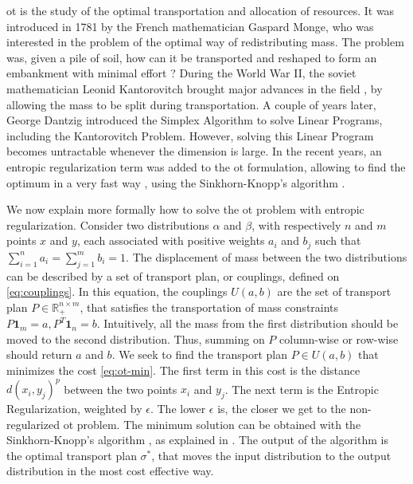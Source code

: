 \acf{ot} is the study of the optimal transportation and allocation of resources.
It was introduced in 1781 by the French mathematician Gaspard Monge,
\cite{monge_memoire_1781} who was interested in the problem of the optimal way
of redistributing mass. The problem was, given a pile of soil, how can it be
transported and reshaped to form an embankment with minimal effort ? During
the World War II, the soviet mathematician Leonid Kantorovitch brought major
advances in the field \cite{kantorovitch_translocation_1958}, by allowing the
mass to be split during transportation. A couple of years later, George
Dantzig introduced the Simplex Algorithm to solve Linear Programs, including
the Kantorovitch Problem. However, solving this Linear Program becomes
untractable whenever the dimension is large. In the recent years, an
entropic regularization term was added to the \ac{ot} formulation, allowing to
find the optimum in a very fast way \cite{cuturi_sinkhorn_2013}, using the
Sinkhorn-Knopp's algorithm \cite{knopp_concerning_1967}.

We now explain more formally how to solve the \ac{ot} problem with entropic
regularization. Consider two distributions $\alpha$ and $\beta$, with
respectively $n$ and $m$ points $x$ and $y$, each associated with positive weights
$a_i$ and $b_j$ such that $\sum_{i=1}^{n} a_i = \sum_{j=1}^{m} b_i = 1$. The
displacement of mass between the two distributions can be described by a
set of transport plan, or couplings, defined on \cref{eq:couplings}. In
this equation, the couplings $U(a, b)$ are the set of transport plan
$P \in \mathbb{R}_{+}^{n \times m}$, that satisfies the transportation of mass
constraints $P \mathbf{1}_m = a, P^T \mathbf{1}_n = b$. Intuitively, all
the mass from the first distribution should be moved to the second
distribution. Thus, summing on $P$ column-wise or row-wise should return $a$
and $b$. We seek to find the transport plan $P \in U(a, b)$ that minimizes the
cost \cref{eq:ot-min}. The first term in this cost is the distance $d(x_i, y_j)^p$ between
the two points $x_i$ and $y_j$. The next term is the Entropic Regularization,
weighted by $\epsilon$. The lower $\epsilon$ is, the closer we get to the
non-regularized \ac{ot} problem. The minimum solution can be obtained
with the Sinkhorn-Knopp's algorithm \cite{knopp_concerning_1967}, as
explained in \cite{peyre_computational_2020,cuturi_sinkhorn_2013}. The output
of the algorithm is the optimal transport plan $\sigma^*$, that moves the input
distribution to the output distribution in the most cost effective way.

